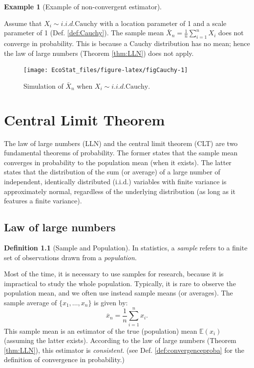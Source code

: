 \documentclass[
  12pt,
]{book}
\theoremstyle{definition}
\newtheorem{definition}{Definition}[chapter]
\theoremstyle{definition}
\newtheorem{example}{Example}[chapter]
\theoremstyle{definition}
\theoremstyle{definition}
\theoremstyle{remark}
\begin{document}
\begin{example}[Example of non-convergent estimator]
\protect\hypertarget{exm:NonConsist}{}\label{exm:NonConsist}

Assume that \(X_i \sim i.i.d. \mbox{Cauchy}\) with a location parameter of 1 and a scale parameter of 1 (Def. \ref{def:Cauchy}). The sample mean \(\bar{X}_n = \frac{1}{n}\sum_{i=1}^{n} X_i\) does not converge in probability. This is because a Cauchy distribution has no mean; hence the law of large numbers (Theorem \ref{thm:LLN}) does not apply.

\begin{figure}
\texttt{[image: EcoStat\_files/figure-latex/figCauchy-1]} \caption{Simulation of $\bar{X}_n$ when $X_i \sim i.i.d. \mbox{Cauchy}$.}\label{fig:figCauchy}
\end{figure}

\end{example}

\hypertarget{TCL}{%
\chapter{Central Limit Theorem}\label{TCL}}

The law of large numbers (LLN) and the central limit theorem (CLT) are two fundamental theorems of probability. The former states that the sample mean converges in probability to the population mean (when it exists). The latter states that the distribution of the sum (or average) of a large number of independent, identically distributed (i.i.d.) variables with finite variance is approximately normal, regardless of the underlying distribution (as long as it features a finite variance).

\hypertarget{law-of-large-numbers}{%
\section{Law of large numbers}\label{law-of-large-numbers}}

\begin{definition}[Sample and Population]
\protect\hypertarget{def:smplpop}{}\label{def:smplpop}In statistics, a \emph{sample} refers to a finite set of observations drawn from a \emph{population}.
\end{definition}

Most of the time, it is necessary to use samples for research, because it is impractical to study the whole population. Typically, it is rare to observe the population mean, and we often use instead sample means (or averages). The sample average of \(\{x_1,\dots,x_n\}\) is given by:
\[
\overline{x}_n = \frac{1}{n}\sum_{i=1}^n x_i.
\]
This sample mean is an estimator of the true (population) mean \(\mathbb{E}(x_i)\) (assuming the latter exists). According to the law of large numbers (Theorem \ref{thm:LLN}), this estimator is \emph{consistent}. (see Def. \ref{def:convergenceproba} for the definition of convergence in probability.)
\end{document}
